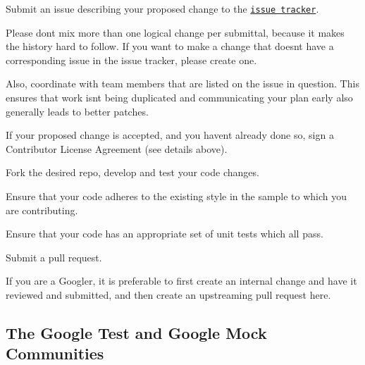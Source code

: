 \begin{DoxyEnumerate}
\item Submit an issue describing your proposed change to the \href{https://github.com/google/googletest}{\tt issue tracker}.
\end{DoxyEnumerate}
\begin{DoxyEnumerate}
\item Please don\textquotesingle{}t mix more than one logical change per submittal, because it makes the history hard to follow. If you want to make a change that doesn\textquotesingle{}t have a corresponding issue in the issue tracker, please create one.
\end{DoxyEnumerate}
\begin{DoxyEnumerate}
\item Also, coordinate with team members that are listed on the issue in question. This ensures that work isn\textquotesingle{}t being duplicated and communicating your plan early also generally leads to better patches.
\end{DoxyEnumerate}
\begin{DoxyEnumerate}
\item If your proposed change is accepted, and you haven\textquotesingle{}t already done so, sign a Contributor License Agreement (see details above).
\end{DoxyEnumerate}
\begin{DoxyEnumerate}
\item Fork the desired repo, develop and test your code changes.
\end{DoxyEnumerate}
\begin{DoxyEnumerate}
\item Ensure that your code adheres to the existing style in the sample to which you are contributing.
\end{DoxyEnumerate}
\begin{DoxyEnumerate}
\item Ensure that your code has an appropriate set of unit tests which all pass.
\end{DoxyEnumerate}
\begin{DoxyEnumerate}
\item Submit a pull request.
\end{DoxyEnumerate}

If you are a Googler, it is preferable to first create an internal change and have it reviewed and submitted, and then create an upstreaming pull request here.

\subsection*{The Google Test and Google Mock Communities}

